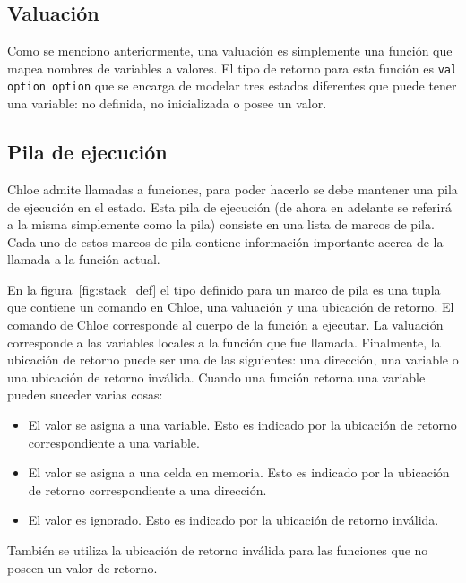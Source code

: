 \subsection{Valuación}\label{subsection:valuation}

Como se menciono anteriormente, una valuación es simplemente una función que mapea nombres de variables a valores.
El tipo de retorno para esta función es \verb|val option option| que se encarga de modelar tres estados diferentes que puede tener una variable: no definida, no inicializada o posee un valor.


\subsection{Pila de ejecución}\label{subsection:stack}

Chloe admite llamadas a funciones, para poder hacerlo se debe mantener una pila de ejecución en el estado.
Esta pila de ejecución (de ahora en adelante se referirá a la misma simplemente como la pila) consiste en una lista de marcos de pila.
Cada uno de estos marcos de pila contiene información importante acerca de la llamada a la función actual.

En la figura~\ref{fig:stack_def} el tipo definido para un marco de pila es una tupla que contiene un comando en Chloe, una valuación y una ubicación de retorno.
El comando de Chloe corresponde al cuerpo de la función a ejecutar.
La valuación corresponde a las variables locales a la función que fue llamada.
Finalmente, la ubicación de retorno puede ser una de las siguientes: una dirección, una variable o una ubicación de retorno inválida.
Cuando una función retorna una variable pueden suceder varias cosas:
\begin{itemize}
  \item{El valor se asigna a una variable.
  Esto es indicado por la ubicación de retorno correspondiente a una variable.}
  \item{El valor se asigna a una celda en memoria.
  Esto es indicado por la ubicación de retorno correspondiente a una dirección.}
  \item{El valor es ignorado.
  Esto es indicado por la ubicación de retorno inválida.}
\end{itemize}

También se utiliza la ubicación de retorno inválida para las funciones que no poseen un valor de retorno.

